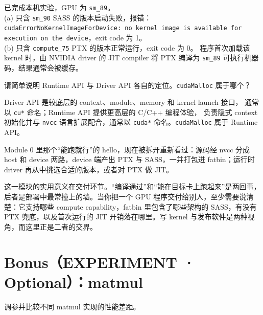 \documentclass[11pt,a4paper,fontset=fandol]{ctexart}
\begin{document}
\begin{answer}
已完成本机实验，GPU 为 \texttt{sm\_89}。\\
(a) 只含 \texttt{sm\_90} SASS 的版本启动失败，报错：
\texttt{cudaErrorNoKernelImageForDevice: no kernel image is available for
execution on the device}，exit code 为 1。\\
(b) 只含 \texttt{compute\_75} PTX 的版本正常运行，exit code 为 0。
程序首次加载该 kernel 时，由 NVIDIA driver 的 JIT compiler 将 PTX 编译为
\texttt{sm\_89} 可执行机器码，结果通常会被缓存。
\end{answer}

请简单说明 Runtime API 与 Driver API 各自的定位。\texttt{cudaMalloc} 属于哪个？

\begin{answer}
Driver API 是较底层的 context、module、memory 和 kernel launch 接口，
通常以 \texttt{cu*} 命名；Runtime API 提供更高层的 C/C++ 编程体验，
负责隐式 context 初始化并与 \texttt{nvcc} 语言扩展配合，通常以
\texttt{cuda*} 命名。\texttt{cudaMalloc} 属于 Runtime API。
\end{answer}

\begin{lookback}
Module 0 里那个“能跑就行”的 hello，现在被拆开重新看过：源码经 nvcc 分成 host 和 device 两路，device 端产出 PTX 与 SASS，一并打包进 fatbin；运行时 driver 再从中挑选合适的版本，或者对 PTX 做 JIT。

这一模块的实用意义在交付环节。“编译通过”和“能在目标卡上跑起来”是两回事，后者是部署中最常撞上的墙。当你把一个 GPU 程序交付给别人，至少需要说清楚：它支持哪些 compute capability，fatbin 里包含了哪些架构的 SASS，有没有 PTX 兜底，以及首次运行的 JIT 开销落在哪里。写 kernel 与发布软件是两种视角，而这里正是二者的交界。
\end{lookback}

\clearpage
\section*{Bonus（EXPERIMENT · Optional）：matmul}

调参并比较不同 matmul 实现的性能差距。
\end{document}
